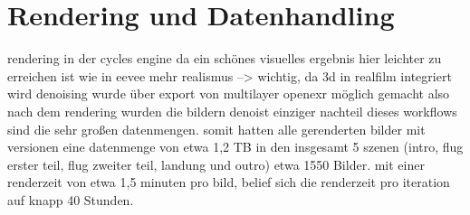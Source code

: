 \section{Rendering und Datenhandling}

rendering in der cycles engine
da ein schönes visuelles ergebnis hier leichter zu erreichen ist wie in eevee
mehr realismus --> wichtig, da 3d in realfilm integriert wird
denoising wurde über export von multilayer openexr möglich gemacht
also nach dem rendering wurden die bildern denoist
einziger nachteil dieses workflows sind die sehr großen datenmengen. somit hatten alle gerenderten bilder mit versionen eine datenmenge von etwa 1,2 TB
in den insgesamt 5 szenen (intro, flug erster teil, flug zweiter teil, landung und outro) etwa 1550 Bilder.
mit einer renderzeit von etwa 1,5 minuten pro bild, belief sich die renderzeit pro iteration auf knapp 40 Stunden.

